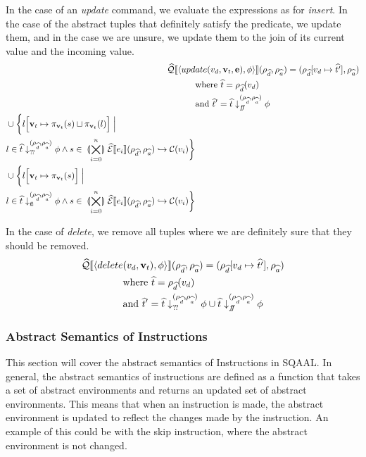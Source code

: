 In the case of an \textit{update} command, we evaluate the expressions as for \textit{insert}.
In the case of the abstract tuples that definitely satisfy the predicate, we update them, and in the case we are unsure, we update them to the join of its current value and the incoming value.
\begin{align}
    \widehat{\mathcal{Q}}\llbracket \langle upd&ate(v_d, \mathbf{v}_t, \mathbf{e}), \phi \rangle \rrbracket (\rho_{\widehat{d}}, \rho_{\widehat{a}}) = (\rho_{\widehat{d}}[v_d\mapsto \widehat{t'}], \rho_{\widehat{a}})\nonumber\\
    &\text{where } \widehat{t}=\rho_{\widehat{d}}(v_d) \nonumber\\
    &\text{and }\widehat{t}' = \widehat{t} \downarrow_{f\!\!f}^{(\rho_{\widehat{d}}, \rho_{\widehat{a}})} \phi \nonumber\\
    \begin{split}
         &\cup \biggl\{ l\Bigl[ \mathbf{v}_t \mapsto \pi_{\mathbf{v}_t}(s) \sqcup \pi_{\mathbf{v}_t}(l) \Bigr] \;\Big|\;\\
         &l \in \widehat{t} \downarrow_{?\!?}^{(\rho_{\widehat{d}}, \rho_{\widehat{a}})} \phi \land s \in \;\llparenthesis\bigtimes_{i = 0}^{n}\rrparenthesis\; \widehat{\mathcal{E}}\llbracket e_i \rrbracket(\rho_{\widehat{d}}, \rho_{\widehat{a}}) \hookrightarrow \mathcal{C}(v_i)\biggr\} \nonumber
    \end{split} \\
    \begin{split}
        &\cup \biggl\{ l\Bigl[ \mathbf{v}_t \mapsto \pi_{\mathbf{v}_t}(s) \Bigr] \;\Big|\;\\
        &l \in \widehat{t} \downarrow_{t\!t}^{(\rho_{\widehat{d}}, \rho_{\widehat{a}})} \phi \land s \in \;\llparenthesis\bigtimes_{i = 0}^{n}\rrparenthesis\; \widehat{\mathcal{E}}\llbracket e_i \rrbracket(\rho_{\widehat{d}}, \rho_{\widehat{a}}) \hookrightarrow \mathcal{C}(v_i)\biggr\}
    \end{split}
\end{align}

In the case of \textit{delete}, we remove all tuples where we are definitely sure that they should be removed.
\begin{align}
    \widehat{\mathcal{Q}}\llbracket \langle delete&(v_d, \mathbf{v}_t), \phi \rangle \rrbracket (\rho_{\widehat{d}}, \rho_{\widehat{a}}) = (\rho_{\widehat{d}}[v_d\mapsto \widehat{t'}], \rho_{\widehat{a}}) \nonumber\\
    &\text{where } \widehat{t}=\rho_{\widehat{d}}(v_d) \nonumber\\
    &\text{and }\widehat{t}' = \widehat{t} \downarrow_{?\!?}^{(\rho_{\widehat{d}}, \rho_{\widehat{a}})} \phi \cup \widehat{t} \downarrow_{f\!\!f}^{(\rho_{\widehat{d}}, \rho_{\widehat{a}})} \phi
\end{align}

\subsubsection{Abstract Semantics of Instructions}
This section will cover the abstract semantics of Instructions in SQAAL.
In general, the abstract semantics of instructions are defined as a function that takes a set of abstract environments and returns an updated set of abstract environments.
This means that when an instruction is made, the abstract environment is updated to reflect the changes made by the instruction.
An example of this could be with the skip instruction, where the abstract environment is not changed.


